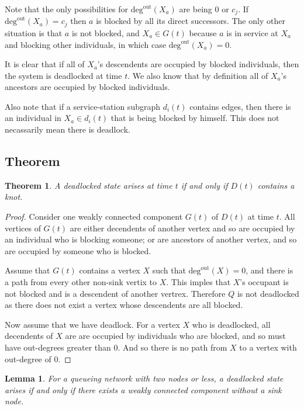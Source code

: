 \documentclass{article}
\newtheorem{theorem}{Theorem}
\newtheorem{lemma}{Lemma}
\begin{document}
Note that the only possibilities for $\text{deg}^{\text{out}}(X_a)$ are being 0 or $c_j$.
If $\text{deg}^{\text{out}}(X_a) = c_j$ then $a$ is blocked by all its direct successors.
The only other situation is that $a$ is not blocked, and $X_a \in G(t)$ because $a$ is in service at $X_a$ and blocking other individuals, in which case $\text{deg}^{\text{out}}(X_a) = 0$.

It is clear that if all of $X_a$'s descendents are occupied by blocked individuals, then the system is deadlocked at time $t$.
We also know that by definition all of $X_a$'s ancestors are occupied by blocked individuals.

Also note that if a service-station subgraph $d_i(t)$ contains edges, then there is an individual in $X_a \in d_i(t)$ that is being blocked by himself.
This does not necassarily mean there is deadlock.


\subsection{Theorem}

\begin{theorem}
A deadlocked state arises at time $t$ if and only if $D(t)$ contains a knot.
\end{theorem}

\begin{proof}
Consider one weakly connected component $G(t)$ of $D(t)$ at time $t$.
All vertices of $G(t)$ are either decendents of another vertex and so are occupied by an individual who is blocking someone; or are ancestors of another vertex, and so are occupied by someone who is blocked.

Assume that $G(t)$ contains a vertex $X$ such that $\text{deg}^{\text{out}}(X) = 0$, and there is a path from every other non-sink vertix to $X$.
This imples that $X$'s occupant is not blocked and is a descendent of another vertrex.
Therefore $Q$ is not deadlocked as there does not exist a vertex whose descendents are all blocked.

Now assume that we have deadlock.
For a vertex $X$ who is deadlocked, all decendents of $X$ are are occupied by individuals who are blocked, and so must have out-degrees greater than 0.
And so there is no path from $X$ to a vertex with out-degree of 0.
\end{proof}


\begin{lemma}
For a queueing network with two nodes or less, a deadlocked state arises if and only if there exists a weakly connected component without a sink node.
\end{lemma}
\end{document}
